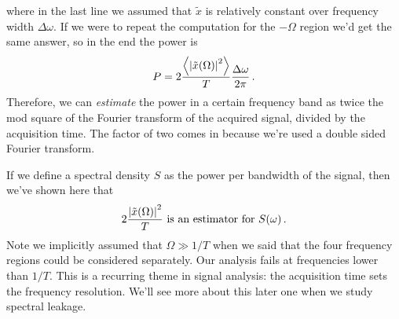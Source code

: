 \documentclass{article}
\begin{document}
where in the last line we assumed that $\tilde{x}$ is relatively constant over frequency width $\Delta \omega$.
If we were to repeat the computation for the $-\Omega$ region we'd get the same answer, so in the end the power is
\begin{equation}
P = 2 \frac{\left \langle \left \lvert \tilde{x}(\Omega) \right \rvert^2 \right \rangle}{T} \frac{\Delta \omega}{2\pi} \, .
\end{equation}
Therefore, we can \emph{estimate} the power in a certain frequency band as twice the mod square of the Fourier transform of the acquired signal, divided by the acquisition time.
The factor of two comes in because we're used a double sided Fourier transform.

If we define a spectral density $S$ as the power per bandwidth of the signal, then we've shown here that
\begin{equation}
2 \frac{\left \lvert \tilde{x}(\Omega) \right \rvert^2}{T} \text{ is an estimator for } S(\omega) \, .
\end{equation}
Note we implicitly assumed that $\Omega \gg 1/T$ when we said that the four frequency regions could be considered separately.
Our analysis fails at frequencies lower than $1/T$.
This is a recurring theme in signal analysis: the acquisition time sets the frequency resolution.
We'll see more about this later one when we study spectral leakage.

\end{document}

